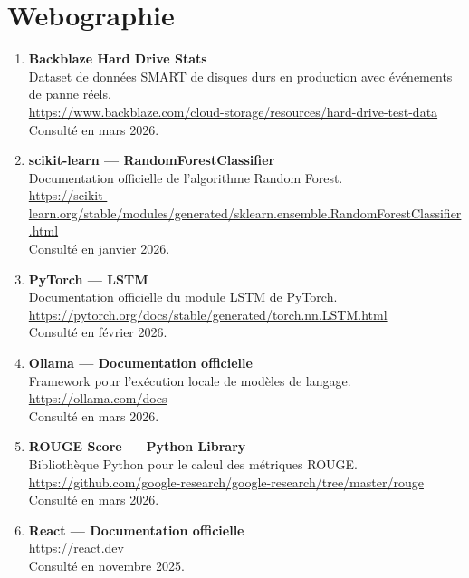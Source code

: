 \chapter*{Webographie}

\begin{enumerate}

\item \textbf{Backblaze Hard Drive Stats} \\
Dataset de données SMART de disques durs en production avec événements de panne réels. \\
\url{https://www.backblaze.com/cloud-storage/resources/hard-drive-test-data} \\
Consulté en mars 2026.

\item \textbf{scikit-learn — RandomForestClassifier} \\
Documentation officielle de l'algorithme Random Forest. \\
\url{https://scikit-learn.org/stable/modules/generated/sklearn.ensemble.RandomForestClassifier.html} \\
Consulté en janvier 2026.

\item \textbf{PyTorch — LSTM} \\
Documentation officielle du module LSTM de PyTorch. \\
\url{https://pytorch.org/docs/stable/generated/torch.nn.LSTM.html} \\
Consulté en février 2026.

\item \textbf{Ollama — Documentation officielle} \\
Framework pour l'exécution locale de modèles de langage. \\
\url{https://ollama.com/docs} \\
Consulté en mars 2026.

\item \textbf{ROUGE Score — Python Library} \\
Bibliothèque Python pour le calcul des métriques ROUGE. \\
\url{https://github.com/google-research/google-research/tree/master/rouge} \\
Consulté en mars 2026.

\item \textbf{React — Documentation officielle} \\
\url{https://react.dev} \\
Consulté en novembre 2025.


\end{enumerate}
